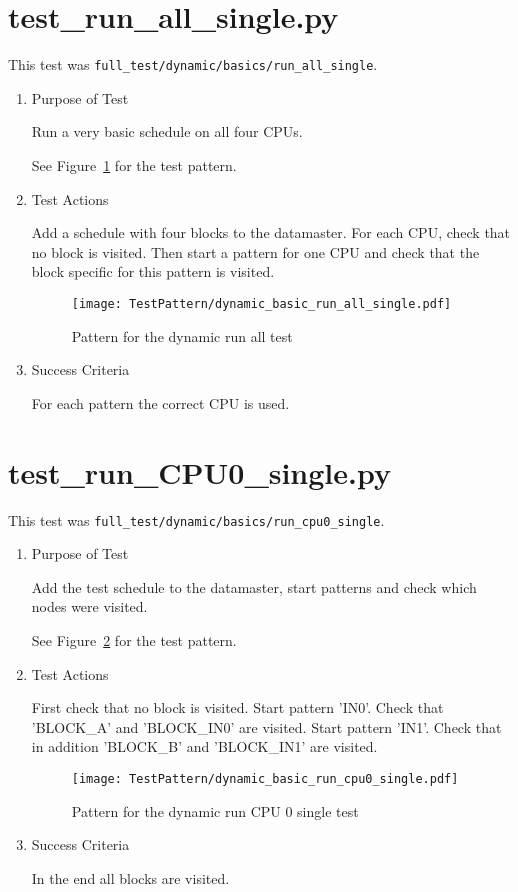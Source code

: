 \documentclass[12pt,a4paper]{report}
\begin{document}
\section{test\_run\_all\_single.py}
This test was \texttt{full\_test/dynamic/basics/run\_all\_single}.
\begin{enumerate}
  \item Purpose of Test

    Run a very basic schedule on all four CPUs.

  See Figure~\ref{fig:Pattern_for_the_dynamic_run_all_test} for the test pattern.
  \item Test Actions

  Add a schedule with four blocks to the datamaster. For each CPU,
  check that no block is visited. Then start a pattern for one CPU and
  check that the block specific for this pattern is visited.
    \begin{figure}
        \centering
        \texttt{[image: TestPattern/dynamic\_basic\_run\_all\_single.pdf]}
        \caption{Pattern for the dynamic run all test}
        \label{fig:Pattern_for_the_dynamic_run_all_test}
    \end{figure}
  \item Success Criteria

  For each pattern the correct CPU is used.
\end{enumerate}

\section{test\_run\_CPU0\_single.py}
This test was \texttt{full\_test/dynamic/basics/run\_cpu0\_single}.
\begin{enumerate}
  \item Purpose of Test

    Add the test schedule to the datamaster, start patterns and check
    which nodes were visited.

  See Figure~\ref{fig:Pattern_for_the_dynamic_run_CPU_0_single_test}
  for the test pattern.
  \item Test Actions

    First check that no block is visited. Start pattern 'IN0'. Check
    that 'BLOCK\_A' and 'BLOCK\_IN0' are visited.
    Start pattern 'IN1'. Check that in addition 'BLOCK\_B' and
    'BLOCK\_IN1' are visited.
    \begin{figure}
        \centering
        \texttt{[image: TestPattern/dynamic\_basic\_run\_cpu0\_single.pdf]}
        \caption{Pattern for the dynamic run CPU 0 single test}
        \label{fig:Pattern_for_the_dynamic_run_CPU_0_single_test}
    \end{figure}
  \item Success Criteria

  In the end all blocks are visited.
\end{enumerate}
\end{document}
